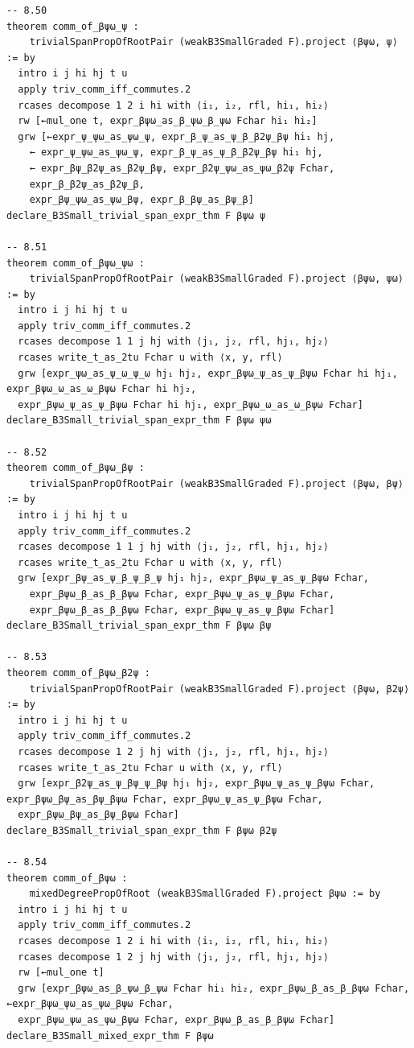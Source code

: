 \begin{Verbatim}
-- 8.50
theorem comm_of_βψω_ψ :
    trivialSpanPropOfRootPair (weakB3SmallGraded F).project ⟨βψω, ψ⟩ := by
  intro i j hi hj t u
  apply triv_comm_iff_commutes.2
  rcases decompose 1 2 i hi with ⟨i₁, i₂, rfl, hi₁, hi₂⟩
  rw [←mul_one t, expr_βψω_as_β_ψω_β_ψω Fchar hi₁ hi₂]
  grw [←expr_ψ_ψω_as_ψω_ψ, expr_β_ψ_as_ψ_β_β2ψ_βψ hi₁ hj,
    ← expr_ψ_ψω_as_ψω_ψ, expr_β_ψ_as_ψ_β_β2ψ_βψ hi₁ hj,
    ← expr_βψ_β2ψ_as_β2ψ_βψ, expr_β2ψ_ψω_as_ψω_β2ψ Fchar,
    expr_β_β2ψ_as_β2ψ_β,
    expr_βψ_ψω_as_ψω_βψ, expr_β_βψ_as_βψ_β]
declare_B3Small_trivial_span_expr_thm F βψω ψ

-- 8.51
theorem comm_of_βψω_ψω :
    trivialSpanPropOfRootPair (weakB3SmallGraded F).project ⟨βψω, ψω⟩ := by
  intro i j hi hj t u
  apply triv_comm_iff_commutes.2
  rcases decompose 1 1 j hj with ⟨j₁, j₂, rfl, hj₁, hj₂⟩
  rcases write_t_as_2tu Fchar u with ⟨x, y, rfl⟩
  grw [expr_ψω_as_ψ_ω_ψ_ω hj₁ hj₂, expr_βψω_ψ_as_ψ_βψω Fchar hi hj₁, expr_βψω_ω_as_ω_βψω Fchar hi hj₂,
  expr_βψω_ψ_as_ψ_βψω Fchar hi hj₁, expr_βψω_ω_as_ω_βψω Fchar]
declare_B3Small_trivial_span_expr_thm F βψω ψω

-- 8.52
theorem comm_of_βψω_βψ :
    trivialSpanPropOfRootPair (weakB3SmallGraded F).project ⟨βψω, βψ⟩ := by
  intro i j hi hj t u
  apply triv_comm_iff_commutes.2
  rcases decompose 1 1 j hj with ⟨j₁, j₂, rfl, hj₁, hj₂⟩
  rcases write_t_as_2tu Fchar u with ⟨x, y, rfl⟩
  grw [expr_βψ_as_ψ_β_ψ_β_ψ hj₁ hj₂, expr_βψω_ψ_as_ψ_βψω Fchar,
    expr_βψω_β_as_β_βψω Fchar, expr_βψω_ψ_as_ψ_βψω Fchar,
    expr_βψω_β_as_β_βψω Fchar, expr_βψω_ψ_as_ψ_βψω Fchar]
declare_B3Small_trivial_span_expr_thm F βψω βψ

-- 8.53
theorem comm_of_βψω_β2ψ :
    trivialSpanPropOfRootPair (weakB3SmallGraded F).project ⟨βψω, β2ψ⟩ := by
  intro i j hi hj t u
  apply triv_comm_iff_commutes.2
  rcases decompose 1 2 j hj with ⟨j₁, j₂, rfl, hj₁, hj₂⟩
  rcases write_t_as_2tu Fchar u with ⟨x, y, rfl⟩
  grw [expr_β2ψ_as_ψ_βψ_ψ_βψ hj₁ hj₂, expr_βψω_ψ_as_ψ_βψω Fchar, expr_βψω_βψ_as_βψ_βψω Fchar, expr_βψω_ψ_as_ψ_βψω Fchar,
  expr_βψω_βψ_as_βψ_βψω Fchar]
declare_B3Small_trivial_span_expr_thm F βψω β2ψ

-- 8.54
theorem comm_of_βψω :
    mixedDegreePropOfRoot (weakB3SmallGraded F).project βψω := by
  intro i j hi hj t u
  apply triv_comm_iff_commutes.2
  rcases decompose 1 2 i hi with ⟨i₁, i₂, rfl, hi₁, hi₂⟩
  rcases decompose 1 2 j hj with ⟨j₁, j₂, rfl, hj₁, hj₂⟩
  rw [←mul_one t]
  grw [expr_βψω_as_β_ψω_β_ψω Fchar hi₁ hi₂, expr_βψω_β_as_β_βψω Fchar, ←expr_βψω_ψω_as_ψω_βψω Fchar,
  expr_βψω_ψω_as_ψω_βψω Fchar, expr_βψω_β_as_β_βψω Fchar]
declare_B3Small_mixed_expr_thm F βψω


\end{Verbatim}
